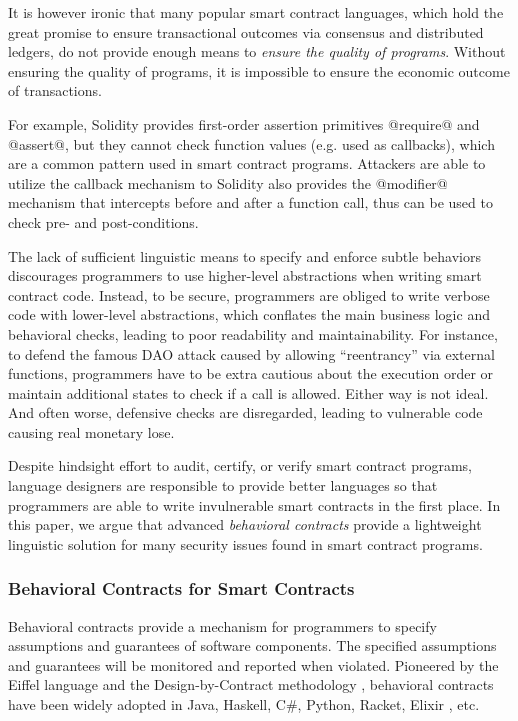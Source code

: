 \documentclass[acmsmall,review,anonymous]{acmart}\settopmatter{printfolios=true,printccs=false,printacmref=false}
\begin{document}
It is however ironic that many popular smart contract languages, which hold the
great promise to ensure transactional outcomes via consensus and distributed
ledgers, do not provide enough means to \emph{ensure the quality of programs}.
Without ensuring the quality of programs, it is impossible to ensure
the economic outcome of transactions.

For example, Solidity provides first-order assertion primitives @require@ and
@assert@, but they cannot check function values (e.g. used as callbacks), which are a
common pattern used in smart contract programs. Attackers are able to utilize
the callback mechanism to 
Solidity also provides the @modifier@ mechanism that intercepts
before and after a function call, thus can be used to check
pre- and post-conditions.

The lack of sufficient linguistic means to specify and enforce subtle behaviors
discourages programmers to use higher-level abstractions when writing smart
contract code.
Instead, to be secure, programmers are obliged to write verbose code with
lower-level abstractions, which conflates the main business logic and
behavioral checks, leading to poor readability and maintainability.
For instance, to defend the famous DAO attack  caused by allowing ``reentrancy''
via external functions, programmers have to be extra cautious about the execution
order or maintain additional states to check if a call is allowed.
Either way is not ideal.
And often worse, defensive checks are disregarded, leading to vulnerable code
causing real monetary lose.

Despite hindsight effort to audit, certify, or verify smart contract programs,
language designers are responsible to provide better languages so that
programmers are able to write invulnerable smart contracts in the first place.
In this paper, we argue that advanced \emph{behavioral contracts} provide a
lightweight linguistic solution for many security issues found in smart
contract programs.

\subsubsection*{\textbf{Behavioral Contracts for Smart Contracts}}
Behavioral contracts provide a mechanism for programmers to specify assumptions
and guarantees of software components. The specified assumptions and guarantees
will be monitored and reported when violated.
Pioneered by the Eiffel language \cite{DBLP:books/ph/Meyer91} and the
Design-by-Contract methodology \cite{DBLP:conf/tools/Meyer98a}, behavioral
contracts have been widely adopted in Java, Haskell, C\#, Python, Racket,
Elixir \cite{DBLP:conf/erlang/0001BBHMEF22}, etc. 
\end{document}
